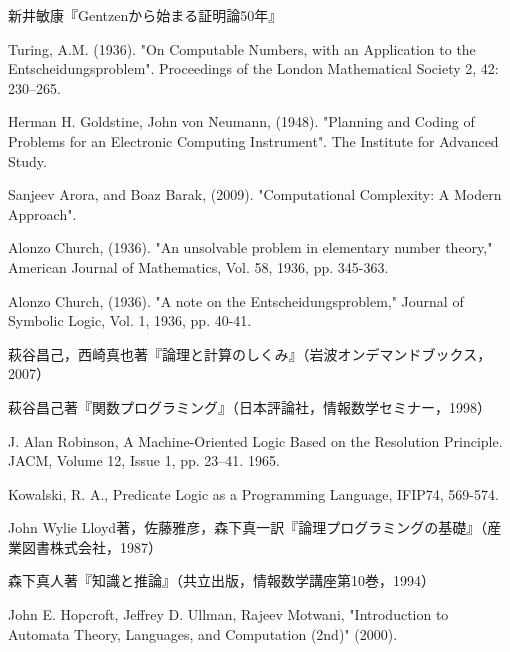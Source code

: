 \documentclass[uplatex, dvipdfmx]{jsreport}
\begin{document}
\begin{thebibliography}{99}
    新井敏康『Gentzenから始まる証明論50年』

    Turing, A.M. (1936). 
    "On Computable Numbers, with an Application to the Entscheidungsproblem". 
    Proceedings of the London Mathematical Society 2, 42: 230–265.

    Herman H. Goldstine, John von Neumann, (1948). 
    "Planning and Coding of Problems for an Electronic Computing Instrument". 
    The Institute for Advanced Study.

    Sanjeev Arora, and Boaz Barak, (2009). 
    "Computational Complexity: A Modern Approach". 

    Alonzo Church, (1936).
    "An unsolvable problem in elementary number theory," American Journal of Mathematics, Vol. 58, 1936, pp. 345-363.

    Alonzo Church, (1936).
    "A note on the Entscheidungsproblem," Journal of Symbolic Logic, Vol. 1, 1936, pp. 40-41.

    萩谷昌己，西崎真也著『論理と計算のしくみ』（岩波オンデマンドブックス，2007）

    萩谷昌己著『関数プログラミング』（日本評論社，情報数学セミナー，1998）

    J. Alan Robinson, A Machine-Oriented Logic Based on the Resolution Principle. JACM, Volume 12, Issue 1, pp. 23–41. 1965.

    Kowalski, R. A., Predicate Logic as a Programming Language, IFIP74, 569-574.

    John Wylie Lloyd著，佐藤雅彦，森下真一訳『論理プログラミングの基礎』（産業図書株式会社，1987）

    森下真人著『知識と推論』（共立出版，情報数学講座第10巻，1994）

    John E. Hopcroft, Jeffrey D. Ullman, Rajeev Motwani, "Introduction to Automata Theory, Languages, and Computation (2nd)" (2000).
\end{thebibliography}
\end{document}
